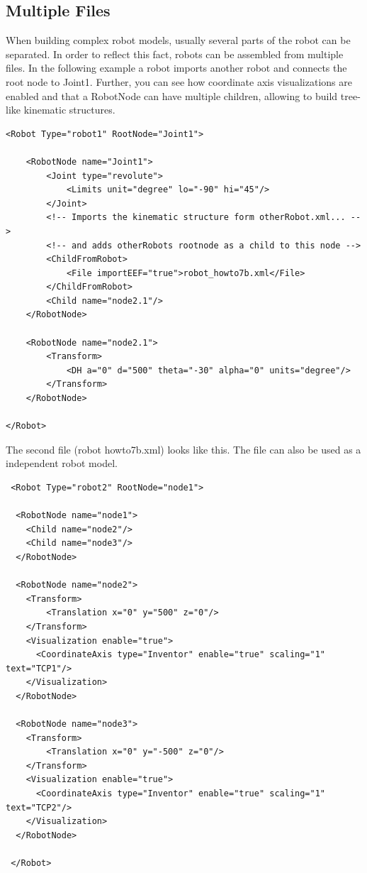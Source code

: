 \documentclass{book}
\begin{document}
\subsection{Multiple Files}
\par
When building complex robot models, usually several parts of the robot can be separated. In order to reflect this fact, robots can be assembled from multiple files. In the following example a robot imports another robot and connects the root node to Joint1. Further, you can see how coordinate axis visualizations are enabled and that a RobotNode can have multiple children, allowing to build tree-like kinematic structures. 
\par
\begin{lstlisting}
<Robot Type="robot1" RootNode="Joint1">

    <RobotNode name="Joint1">
        <Joint type="revolute">
            <Limits unit="degree" lo="-90" hi="45"/>
        </Joint>
        <!-- Imports the kinematic structure form otherRobot.xml... -->
        <!-- and adds otherRobots rootnode as a child to this node -->
        <ChildFromRobot>
            <File importEEF="true">robot_howto7b.xml</File>
        </ChildFromRobot>
        <Child name="node2.1"/>
    </RobotNode>

    <RobotNode name="node2.1">
        <Transform>
            <DH a="0" d="500" theta="-30" alpha="0" units="degree"/>
        </Transform>
    </RobotNode>

</Robot>
\end{lstlisting}
\par
The second file (robot howto7b.xml) looks like this. The file can also be used as a independent robot model. 
 \par
 \begin{lstlisting}
 <Robot Type="robot2" RootNode="node1">
 
  <RobotNode name="node1">
    <Child name="node2"/>
    <Child name="node3"/>
  </RobotNode>
 
  <RobotNode name="node2">
    <Transform>
        <Translation x="0" y="500" z="0"/>
    </Transform>
    <Visualization enable="true">
      <CoordinateAxis type="Inventor" enable="true" scaling="1" text="TCP1"/>
    </Visualization>
  </RobotNode>
 
  <RobotNode name="node3">
    <Transform>
        <Translation x="0" y="-500" z="0"/>
    </Transform>
    <Visualization enable="true">
      <CoordinateAxis type="Inventor" enable="true" scaling="1" text="TCP2"/>
    </Visualization>
  </RobotNode>
 
 </Robot>
 \end{lstlisting}
\end{document}
